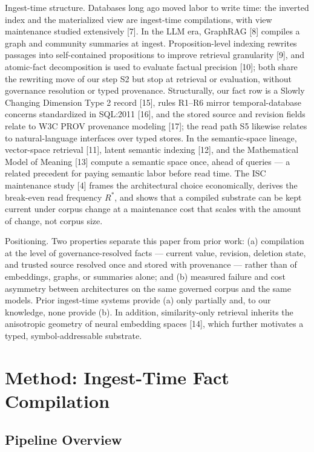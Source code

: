 \documentclass[conference,a4paper]{IEEEtran}
\begin{document}
Ingest-time structure. Databases long ago moved labor to write time: the inverted index and the materialized view are ingest-time compilations, with view maintenance studied extensively [7]. In the LLM era, GraphRAG [8] compiles a graph and community summaries at ingest. Proposition-level indexing rewrites passages into self-contained propositions to improve retrieval granularity [9], and atomic-fact decomposition is used to evaluate factual precision [10]; both share the rewriting move of our step S2 but stop at retrieval or evaluation, without governance resolution or typed provenance. Structurally, our fact row is a Slowly Changing Dimension Type 2 record [15], rules R1--R6 mirror temporal-database concerns standardized in SQL:2011 [16], and the stored source and revision fields relate to W3C PROV provenance modeling [17]; the read path S5 likewise relates to natural-language interfaces over typed stores. In the semantic-space lineage, vector-space retrieval [11], latent semantic indexing [12], and the Mathematical Model of Meaning [13] compute a semantic space once, ahead of queries --- a related precedent for paying semantic labor before read time. The ISC maintenance study [4] frames the architectural choice economically, derives the break-even read frequency $R^{*}$, and shows that a compiled substrate can be kept current under corpus change at a maintenance cost that scales with the amount of change, not corpus size.

Positioning. Two properties separate this paper from prior work: (a) compilation at the level of governance-resolved facts --- current value, revision, deletion state, and trusted source resolved once and stored with provenance --- rather than of embeddings, graphs, or summaries alone; and (b) measured failure and cost asymmetry between architectures on the same governed corpus and the same models. Prior ingest-time systems provide (a) only partially and, to our knowledge, none provide (b). In addition, similarity-only retrieval inherits the anisotropic geometry of neural embedding spaces [14], which further motivates a typed, symbol-addressable substrate.

\section{Method: Ingest-Time Fact Compilation}

\subsection{Pipeline Overview}
\end{document}
